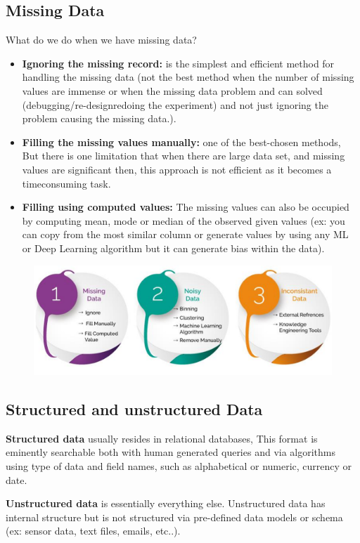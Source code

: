 \documentclass{report}
\begin{document}
\subsection{Missing Data}
\noindent What do we do when we have missing data? 
\begin{itemize}
    \item \textbf{Ignoring the missing record:} is the simplest and efficient method for handling the missing data (not the best method when the number of missing values are immense or  when the missing data problem and can solved (debugging/re-designredoing the experiment) and not just ignoring the problem causing the missing data.). 
    \item \textbf{Filling the missing values manually:} one of the best-chosen methods, But there is one limitation that when there are large data set, and missing values are significant then, this approach is not efficient as it becomes a timeconsuming task.
    \item \textbf{Filling using computed values:} The missing values can also be occupied by computing mean, mode or median of the observed given values (ex: you can copy from the most similar column or generate values by using any ML or Deep Learning algorithm but  it can generate bias within the data). 
\end{itemize}

\begin{figure}[H]
    \centering
    \includegraphics[width=0.8\linewidth]{images/data missing.png}
\end{figure}

\subsection{Structured and unstructured Data }
\noindent \textbf{Structured data} usually resides in relational databases, This format is eminently searchable both with human generated queries and via algorithms using type of data and field names, such as alphabetical or numeric, currency or date.

\noindent \textbf{Unstructured data} is essentially everything else. Unstructured data has internal structure but is not structured via pre-defined data models or schema (ex: sensor data, text files, emails, etc..).
\end{document}
